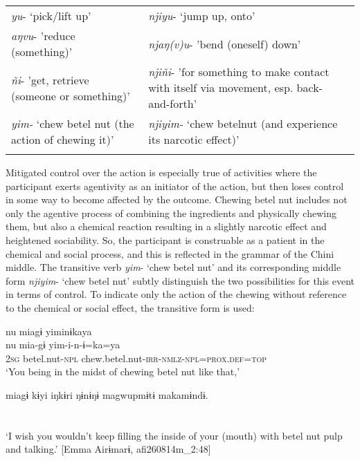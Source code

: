 \documentclass[output=paper]{langscibook}
\begin{document}
\begin{table}
{\begin{tabularx}{\textwidth}{Xp{5cm}X}
{\textit{yu}- ‘pick/lift up’} & \textit{njiyu}- ‘jump up, onto’ & \\
{\textit{aŋvu}- 'reduce (something)'} & \textit{njaŋ(v)u}- 'bend (oneself) down' & \\
{\textit{ñi}- 'get, retrieve (someone or something)'} & \textit{njiñi}- 'for something to make contact with itself via movement, esp. back-and-forth' & \\
{\textit{yim-} `chew betel nut (the action of chewing it)'} & \textit{njiyim-} `chew betelnut (and experience its narcotic effect)' & \\
\lspbottomrule
\end{tabularx}
}
\end{table}

\label{sec:brooks:4.2.1.3.1}

Mitigated control over the action is especially true of activities where the participant exerts agentivity as an initiator of the action, but then loses control in some way to become affected by the outcome. Chewing betel nut includes not only the agentive process of combining the ingredients and physically chewing them, but also a chemical reaction resulting in a slightly narcotic effect and heightened sociability. So, the participant is construable as a patient in the chemical and social process, and this is reflected in the grammar of the Chini middle. The transitive verb \textit{yim}- ‘chew betel nut’ and its corresponding middle form \textit{njiyim}- ‘chew betel nut’ subtly distinguish the two possibilities for this event in terms of control. To indicate only the action of the chewing without reference to the chemical or social effect, the transitive form is used:

\ea\label{ex:brooks:32}
\glll nu  miagɨ   yiminɨkaya\\
 nu  mia-gɨ   yim-i-n-ɨ=ka=ya\\
2\textsc{sg}  betel.nut-\textsc{npl}  chew.betel.nut-\textsc{irr-nmlz-npl=prox.def=top}\\
 \glt `You being in the midst of chewing betel nut like that,'

 \glll miagɨ kɨyi iŋkɨri ŋɨnɨŋɨ magwupmɨtɨ makamɨndɨ.\\
 \\
 \\
\glt `I wish you wouldn’t keep filling the inside of your (mouth) with betel nut pulp and talking.' [Emma Airɨmarɨ, afi260814m\_2:48]
\z
\end{document}
